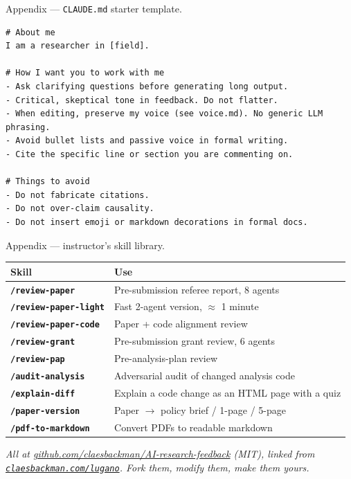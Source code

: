 \documentclass[aspectratio=169, 10pt]{beamer}
\begin{document}
\begin{frame}[fragile]{Appendix --- \texttt{CLAUDE.md} starter template.}
\small
\begin{verbatim}
# About me
I am a researcher in [field].

# How I want you to work with me
- Ask clarifying questions before generating long output.
- Critical, skeptical tone in feedback. Do not flatter.
- When editing, preserve my voice (see voice.md). No generic LLM phrasing.
- Avoid bullet lists and passive voice in formal writing.
- Cite the specific line or section you are commenting on.

# Things to avoid
- Do not fabricate citations.
- Do not over-claim causality.
- Do not insert emoji or markdown decorations in formal docs.
\end{verbatim}
\end{frame}

\begin{frame}{Appendix --- instructor's skill library.}
\vskip0.2cm
\small
\begin{tabular}{>{\bfseries\color{mckdeep}}ll}
\toprule
\rowcolor{mcklight}
\textbf{\textcolor{mckdeep}{Skill}} & \textbf{\textcolor{mckdeep}{Use}} \\
\midrule
\texttt{/review-paper}       & Pre-submission referee report, 8 agents \\
\texttt{/review-paper-light} & Fast 2-agent version, $\approx$ 1 minute \\
\texttt{/review-paper-code}  & Paper + code alignment review \\
\texttt{/review-grant}       & Pre-submission grant review, 6 agents \\
\texttt{/review-pap}         & Pre-analysis-plan review \\
\texttt{/audit-analysis}     & Adversarial audit of changed analysis code \\
\texttt{/explain-diff}       & Explain a code change as an HTML page with a quiz \\
\texttt{/paper-version}      & Paper $\to$ policy brief / 1-page / 5-page \\
\texttt{/pdf-to-markdown}    & Convert PDFs to readable markdown \\
\bottomrule
\end{tabular}

\vskip0.3cm
\textit{All at \href{https://github.com/claesbackman/AI-research-feedback}{github.com/claesbackman/AI-research-feedback} (MIT), linked from \href{https://claesbackman.com/lugano}{\texttt{claesbackman.com/lugano}}. Fork them, modify them, make them yours.}
\end{frame}
\end{document}

